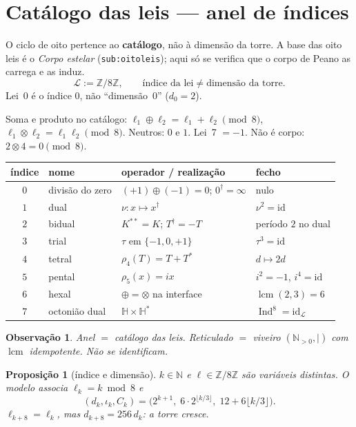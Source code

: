 \documentclass[11pt,a4paper]{article}
\newtheorem{proposicao}{Proposição}
\newtheorem{observacao}{Observação}
\newcommand{\code}[1]{\texttt{#1}}
\begin{document}
\section{Catálogo das leis --- anel de índices}\label{sec:catalogo}

O ciclo de oito pertence ao \textbf{catálogo}, não à dimensão da torre.
A base das oito leis é o \emph{Corpo estelar} (\code{sub:oitoleis});
aqui só se verifica que o corpo de Peano as carrega e as induz.
\[
\mathcal L:=\mathbb{Z}/8\mathbb{Z},
\qquad
\boxed{\text{índice da lei}\neq\text{dimensão da torre}.}
\]
\label{def:anel}
Lei~0 é o índice $0$, não ``dimensão~$0$'' ($d_0=2$).

Soma e produto no catálogo: $\ell_1\oplus\ell_2=\ell_1+\ell_2\pmod8$,
$\ell_1\otimes\ell_2=\ell_1\ell_2\pmod8$. Neutros: $0$ e $1$.
Lei~7 $=-1$. Não é corpo: $2\otimes4=0\pmod8$.

\begin{center}\small
\begin{tabular}{@{}clll@{}}
índice & nome & operador / realização & fecho \\
\hline
$0$ & divisão do zero & $(+1)\oplus(-1)=0$; $0^{\dagger}=\infty$ & nulo \\
$1$ & dual & $\nu\colon x\mapsto x^{\dagger}$ & $\nu^{2}=\mathrm{id}$ \\
$2$ & bidual & $K^{**}=K$; $T^{\dagger}=-T$ & período $2$ no dual \\
$3$ & trial & $\tau$ em $\{-1,0,+1\}$ & $\tau^{3}=\mathrm{id}$ \\
$4$ & tetral & $\rho_4(T)=T+T^{*}$ & $d\mapsto2d$ \\
$5$ & pental & $\rho_5(x)=ix$ & $i^{2}=-1$, $i^{4}=\mathrm{id}$ \\
$6$ & hexal & $\oplus=\otimes$ na interface & $\operatorname{lcm}(2,3)=6$ \\
$7$ & octonião dual & $\mathbb{H}\times\mathbb{H}^{*}$ & $\operatorname{Ind}^{8}=\mathrm{id}_{\mathcal L}$ \\
\end{tabular}
\end{center}

\begin{observacao}
Anel $=$ catálogo das leis. Reticulado $=$ viveiro
$(\mathbb{N}_{>0},\mid)$ com $\operatorname{lcm}$ idempotente.
Não se identificam.
\end{observacao}

\begin{proposicao}[índice e dimensão]\label{cor:unicidade}
$k\in\mathbb{N}$ e $\ell\in\mathbb{Z}/8\mathbb{Z}$ são variáveis
distintas. O modelo associa $\ell_k=k\bmod8$ e
\[
(d_k,\iota_k,C_k)
=\bigl(2^{k+1},\;6\cdot2^{\lfloor k/3\rfloor},\;
12+6\lfloor k/3\rfloor\bigr).
\]
$\ell_{k+8}=\ell_k$, mas $d_{k+8}=256\,d_k$: a torre cresce.
\end{proposicao}
\end{document}
